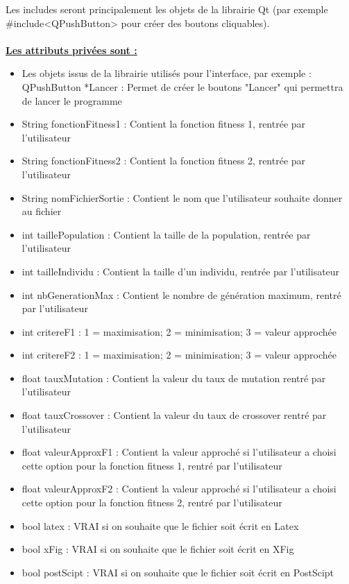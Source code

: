 \documentclass[a4paper,11pt]{article}
\begin{document}
			
			Les includes seront principalement les objets de la librairie Qt 
			(par exemple \#include<QPushButton> pour créer des boutons cliquables).\\
			\\
			\underline{\bf Les attributs privées sont :}\\
				\begin{itemize}
				\item Les objets issus de la librairie utilisés pour l'interface, par exemple :\\
					QPushButton *Lancer : Permet de créer le boutons "Lancer" qui permettra de lancer le programme\vspace{0.2cm}
				\item String fonctionFitness1 : Contient la fonction fitness 1, rentrée par l'utilisateur
				\item String fonctionFitness2 : Contient la fonction fitness 2, rentrée par l'utilisateur
				\item String nomFichierSortie : Contient le nom que l'utilisateur souhaite donner au fichier
				\item int taillePopulation : Contient la taille de la population, rentrée par l'utilisateur
				\item int tailleIndividu : Contient la taille d'un individu, rentrée par l'utilisateur
				\item int nbGenerationMax : Contient le nombre de génération maximum, rentré par l'utilisateur
				\item int critereF1 : 1  = maximisation; 2 = minimisation; 3 = valeur approchée
				\item int critereF2 : 1  = maximisation; 2 = minimisation; 3 = valeur approchée
				\item float tauxMutation : Contient la valeur du taux de mutation rentré par l'utilisateur
				\item float tauxCrossover : Contient la valeur du taux de crossover rentré par l'utilisateur
				\item float valeurApproxF1 : Contient la valeur approché si l'utilisateur a choisi cette option pour la fonction fitness 1, rentré par l'utilisateur
				\item float valeurApproxF2 : Contient la valeur approché si l'utilisateur a choisi cette option pour la fonction fitness 2, rentré par l'utilisateur
				\item bool latex : VRAI si on souhaite que le fichier soit écrit en Latex
				\item bool xFig : VRAI si on souhaite que le fichier soit écrit en XFig
				\item bool postScipt : VRAI si on souhaite que le fichier soit écrit en PostScipt\\
			\end{itemize}
\end{document}
